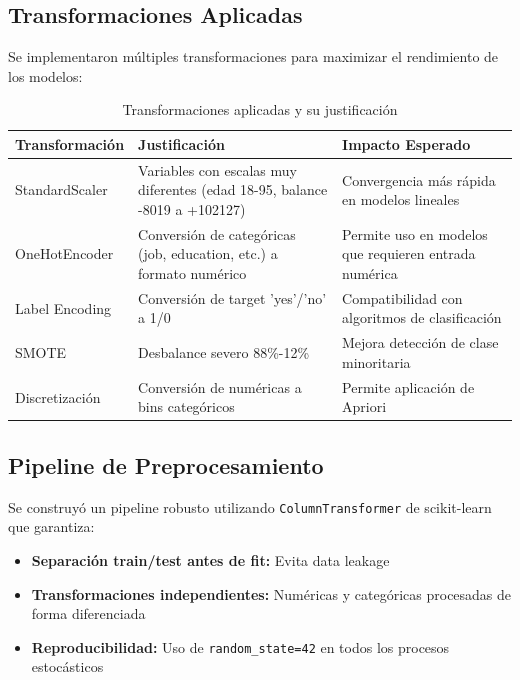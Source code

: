 \documentclass[12pt,letterpaper]{article}
\begin{document}
\subsection{Transformaciones Aplicadas}

Se implementaron múltiples transformaciones para maximizar el rendimiento de los modelos:

\begin{table}[H]
\centering
\caption{Transformaciones aplicadas y su justificación}
\label{tab:transformaciones}
\begin{tabular}{@{}lp{6cm}p{4cm}@{}}
\toprule
\textbf{Transformación} & \textbf{Justificación} & \textbf{Impacto Esperado} \\
\midrule
StandardScaler & Variables con escalas muy diferentes (edad 18-95, balance -8019 a +102127) & Convergencia más rápida en modelos lineales \\
\midrule
OneHotEncoder & Conversión de categóricas (job, education, etc.) a formato numérico & Permite uso en modelos que requieren entrada numérica \\
\midrule
Label Encoding & Conversión de target 'yes'/'no' a 1/0 & Compatibilidad con algoritmos de clasificación \\
\midrule
SMOTE & Desbalance severo 88\%-12\% & Mejora detección de clase minoritaria \\
\midrule
Discretización & Conversión de numéricas a bins categóricos & Permite aplicación de Apriori \\
\bottomrule
\end{tabular}
\end{table}

\subsection{Pipeline de Preprocesamiento}

Se construyó un pipeline robusto utilizando \texttt{ColumnTransformer} de scikit-learn que garantiza:

\begin{itemize}
    \item \textbf{Separación train/test antes de fit:} Evita data leakage
    \item \textbf{Transformaciones independientes:} Numéricas y categóricas procesadas de forma diferenciada
    \item \textbf{Reproducibilidad:} Uso de \texttt{random\_state=42} en todos los procesos estocásticos
\end{itemize}
\end{document}
